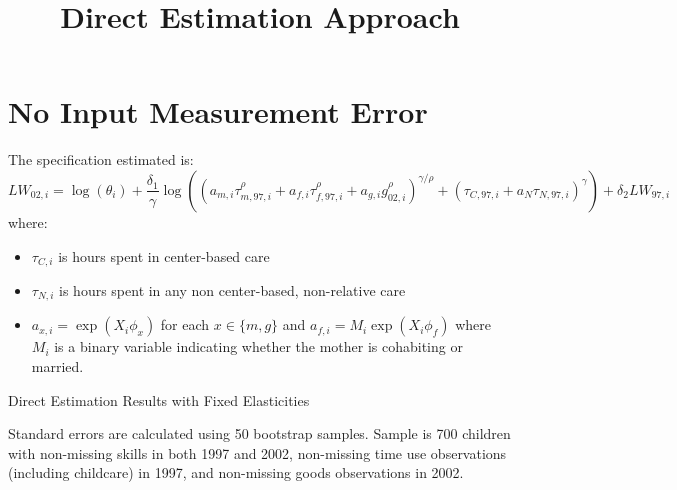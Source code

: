 \documentclass{article}
\title{Direct Estimation Approach}
\author{}
\begin{document}
\maketitle
\section{No Input Measurement Error}
The specification estimated is:
\[ LW_{02,i} = \log(\theta_{i}) + \frac{\delta_{1}}{\gamma}\log\left(\left(a_{m,i}\tau^{\rho}_{m,97,i}+a_{f,i}\tau^{\rho}_{f,97,i} + a_{g,i}g^{\rho}_{02,i}\right)^{\gamma/\rho} + (\tau_{C,97,i}+a_{N}\tau_{N,97,i})^{\gamma}\right) + \delta_{2}LW_{97,i} \]
where:
\begin{itemize}
    \item $\tau_{C,i}$ is hours spent in center-based care
    \item $\tau_{N,i}$ is hours spent in any non center-based, non-relative care
    \item $a_{x,i} = \exp(X_{i}\phi_{x})$ for each $x\in\{m,g\}$ and $a_{f,i} = M_{i}\exp(X_{i}\phi_{f})$ where $M_{i}$ is a binary variable indicating whether the mother is cohabiting or married.
\end{itemize}


\begin{table}\footnotesize\caption{Direct Estimation Results with Fixed Elasticities}
    \begin{center}
        
        \captionsetup{width=0.7\textwidth}
        \caption*{Standard errors are calculated using 50 bootstrap samples. Sample is 700 children with non-missing skills in both 1997 and 2002, non-missing time use observations (including childcare) in 1997, and non-missing goods observations in 2002.}
    \end{center}
    \end{table}
\end{document}

